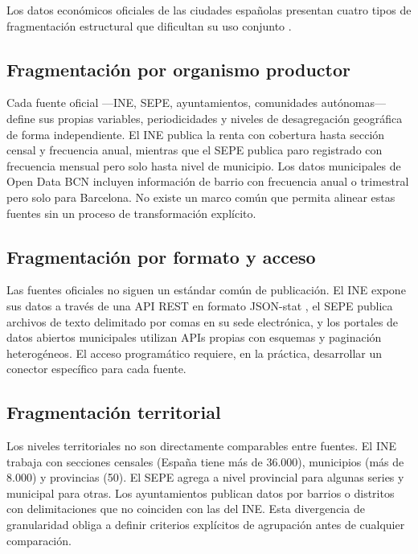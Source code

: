 Los datos económicos oficiales de las ciudades españolas presentan cuatro tipos de fragmentación estructural que dificultan su uso conjunto \parencite{Kitchin2014DataRevolution}.

\subsection{Fragmentación por organismo productor}

Cada fuente oficial —INE, SEPE, ayuntamientos, comunidades autónomas— define sus propias variables, periodicidades y niveles de desagregación geográfica de forma independiente. El INE publica la renta con cobertura hasta sección censal y frecuencia anual, mientras que el SEPE publica paro registrado con frecuencia mensual pero solo hasta nivel de municipio. Los datos municipales de Open Data BCN incluyen información de barrio con frecuencia anual o trimestral pero solo para Barcelona. No existe un marco común que permita alinear estas fuentes sin un proceso de transformación explícito.

\subsection{Fragmentación por formato y acceso}

Las fuentes oficiales no siguen un estándar común de publicación. El INE expone sus datos a través de una API REST en formato JSON-stat \parencite{INE2022API}, el SEPE publica archivos de texto delimitado por comas en su sede electrónica, y los portales de datos abiertos municipales utilizan APIs propias con esquemas y paginación heterogéneos. El acceso programático requiere, en la práctica, desarrollar un conector específico para cada fuente.

\subsection{Fragmentación territorial}

Los niveles territoriales no son directamente comparables entre fuentes. El INE trabaja con secciones censales (España tiene más de 36.000), municipios (más de 8.000) y provincias (50). El SEPE agrega a nivel provincial para algunas series y municipal para otras. Los ayuntamientos publican datos por barrios o distritos con delimitaciones que no coinciden con las del INE. Esta divergencia de granularidad obliga a definir criterios explícitos de agrupación antes de cualquier comparación.

